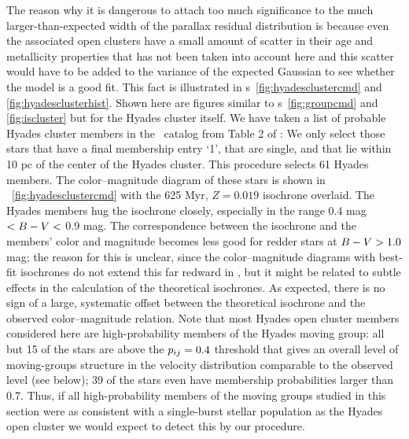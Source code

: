 The reason why it is dangerous to attach too much significance to the
much larger-than-expected width of the parallax residual distribution
is because even the associated open clusters have a small amount of
scatter in their age and metallicity properties that has not been
taken into account here and this scatter would have to be added to the
variance of the expected Gaussian to see whether the model is a good
fit. This fact is illustrated in \figurename
s~\ref{fig:hyadesclustercmd} and \ref{fig:hyadesclusterhist}. Shown
here are figures similar to \figurename s~\ref{fig:groupcmd} and
\ref{fig:iscluster} but for the Hyades cluster itself. We have taken a
list of probable Hyades cluster members in the \Hipparcos\ catalog
from Table 2 of \citet{Perryman98a}: We only select those stars that
have a final membership entry `1', that are single, and that lie
within 10 pc of the center of the Hyades cluster. This procedure
selects 61 Hyades members. The color--magnitude diagram of these stars
is shown in \figurename~\ref{fig:hyadesclustercmd} with the 625 Myr,
$Z= 0.019$ isochrone overlaid. The Hyades members hug the isochrone
closely, especially in the range 0.4 mag $< B-V <$ 0.9 mag. The
correspondence between the isochrone and the members' color and
magnitude becomes less good for redder stars at $B-V > 1.0$ mag;
the reason for this is unclear, since the color--magnitude diagrams
with best-fit isochrones do not extend this far redward in
\citet{Perryman98a}, but it might be related to subtle effects in the
calculation of the theoretical isochrones. As expected, there is no
sign of a large, systematic offset between the theoretical isochrone
and the observed color--magnitude relation. Note that most Hyades open
cluster members considered here are high-probability members of the
Hyades moving group: all but 15 of the stars are above the $p_{ij} =
0.4$ threshold that gives an overall level of moving-groups structure
in the velocity distribution comparable to the observed level (see
below); 39 of the stars even have membership probabilities
larger than 0.7. Thus, if all high-probability members of the moving
groups studied in this section were as consistent with a single-burst
stellar population as the Hyades open cluster we would expect to
detect this by our procedure.

